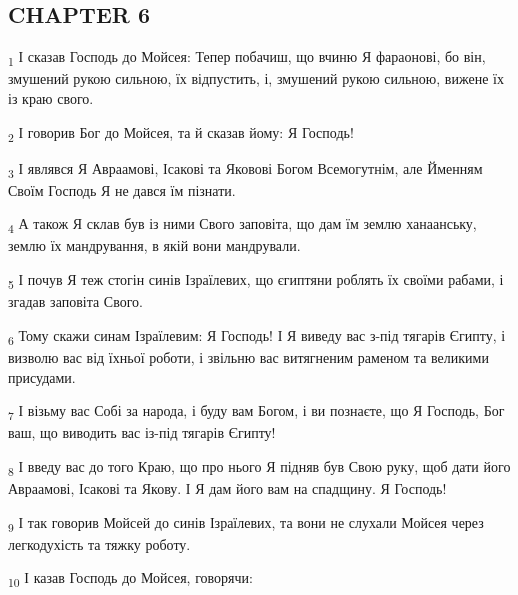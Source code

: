 \subsection{CHAPTER 6}
\begin{tcolorbox}
\textsubscript{1} І сказав Господь до Мойсея: Тепер побачиш, що вчиню Я фараонові, бо він, змушений рукою сильною, їх відпустить, і, змушений рукою сильною, вижене їх із краю свого.
\end{tcolorbox}
\begin{tcolorbox}
\textsubscript{2} І говорив Бог до Мойсея, та й сказав йому: Я Господь!
\end{tcolorbox}
\begin{tcolorbox}
\textsubscript{3} І являвся Я Авраамові, Ісакові та Яковові Богом Всемогутнім, але Йменням Своїм Господь Я не дався їм пізнати.
\end{tcolorbox}
\begin{tcolorbox}
\textsubscript{4} А також Я склав був із ними Свого заповіта, що дам їм землю ханаанську, землю їх мандрування, в якій вони мандрували.
\end{tcolorbox}
\begin{tcolorbox}
\textsubscript{5} І почув Я теж стогін синів Ізраїлевих, що єгиптяни роблять їх своїми рабами, і згадав заповіта Свого.
\end{tcolorbox}
\begin{tcolorbox}
\textsubscript{6} Тому скажи синам Ізраїлевим: Я Господь! І Я виведу вас з-під тягарів Єгипту, і визволю вас від їхньої роботи, і звільню вас витягненим раменом та великими присудами.
\end{tcolorbox}
\begin{tcolorbox}
\textsubscript{7} І візьму вас Собі за народа, і буду вам Богом, і ви познаєте, що Я Господь, Бог ваш, що виводить вас із-під тягарів Єгипту!
\end{tcolorbox}
\begin{tcolorbox}
\textsubscript{8} І введу вас до того Краю, що про нього Я підняв був Свою руку, щоб дати його Авраамові, Ісакові та Якову. І Я дам його вам на спадщину. Я Господь!
\end{tcolorbox}
\begin{tcolorbox}
\textsubscript{9} І так говорив Мойсей до синів Ізраїлевих, та вони не слухали Мойсея через легкодухість та тяжку роботу.
\end{tcolorbox}
\begin{tcolorbox}
\textsubscript{10} І казав Господь до Мойсея, говорячи:
\end{tcolorbox}
